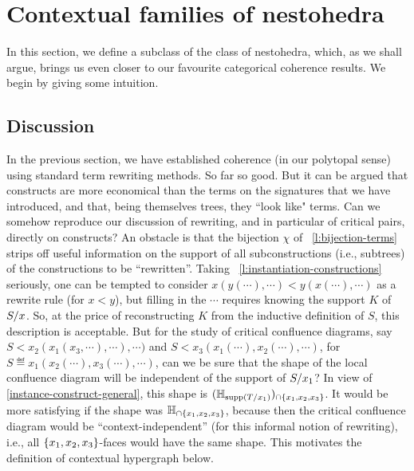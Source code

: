 
\section{Contextual families of nestohedra} 
\label{s:contextual}

In this section, we define a subclass of the class of  nestohedra, which, as we shall argue, brings us even closer to
our favourite categorical coherence results. We begin by giving some intuition.

\subsection{Discussion} \label{contextual-discussion}

In the previous section, we have established coherence (in our polytopal sense) using standard term rewriting methods. So far so good. But  it can be argued that constructs are more economical than the terms on the signatures that we have introduced, and that, being themselves trees, they ``look like" terms. 
Can we somehow reproduce our discussion of rewriting, and in particular of critical pairs, directly on constructs?
An obstacle is that the bijection $\chi$ of~ \cref{l:bijection-terms} strips off useful information on the support of all subconstructions (i.e.,  subtrees) of the constructions to be ``rewritten''.  Taking~ \cref{l:instantiation-constructions} seriously, one can be tempted to consider $x(y(\cdots),\cdots)< y(x(\cdots),\cdots)$ as a rewrite rule (for $x<y$), but filling in the $\cdots$ requires knowing the support $K$ of $S/x$.  So, at the price of reconstructing $K$ from the inductive definition of $S$,  this description is acceptable. But for the study of critical confluence diagrams, say   $S < x_2(x_1(x_3,\cdots),\cdots),\cdots)$ and $S < x_3(x_1(\cdots),x_2(\cdots),\cdots)$, for $S\eqdef  x_1(x_2(\cdots),x_3(\cdots),\cdots)$, can we be sure that the shape of the local confluence diagram will be independent of the support of $S/x_1$?  In view of~ \cref{instance-construct-general}, this shape is
$({\mathbb H}_{\operatorname{supp}(T/x_1)})_{\cap \left\{x_1,x_2,x_3\right\}}$.  It would be more satisfying if the shape was
${\mathbb H}_{\cap \left\{x_1,x_2,x_3\right\}}$, because then the critical confluence diagram would be ``context-independent'' (for this informal notion of rewriting), i.e., all $\left\{x_1,x_2,x_3\right\}$-faces would have the same shape.
This motivates the definition of contextual hypergraph below. 



